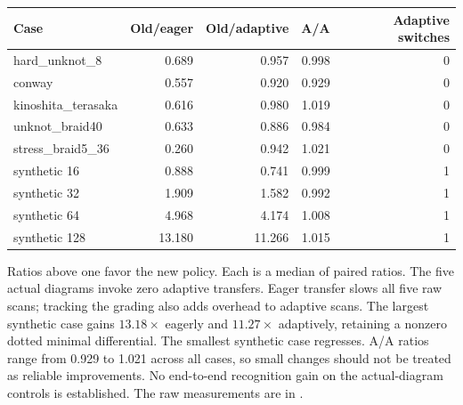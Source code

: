 \begin{center}\small
\begin{tabular}{lrrrr}
\toprule
Case & Old/eager & Old/adaptive & A/A & Adaptive switches\\
\midrule
hard\_unknot\_8 & 0.689 & 0.957 & 0.998 & 0\\
conway & 0.557 & 0.920 & 0.929 & 0\\
kinoshita\_terasaka & 0.616 & 0.980 & 1.019 & 0\\
unknot\_braid40 & 0.633 & 0.886 & 0.984 & 0\\
stress\_braid5\_36 & 0.260 & 0.942 & 1.021 & 0\\
synthetic 16 & 0.888 & 0.741 & 0.999 & 1\\
synthetic 32 & 1.909 & 1.582 & 0.992 & 1\\
synthetic 64 & 4.968 & 4.174 & 1.008 & 1\\
synthetic 128 & 13.180 & 11.266 & 1.015 & 1\\
\bottomrule
\end{tabular}
\end{center}
Ratios above one favor the new policy. Each is a median of paired ratios.
The five actual diagrams invoke zero adaptive transfers. Eager transfer slows
all five raw scans; tracking the grading also adds overhead to adaptive scans.
The largest synthetic case gains $13.18\times$ eagerly and $11.27\times$
adaptively, retaining a nonzero dotted minimal differential. The smallest
synthetic case regresses. A/A ratios range from 0.929 to 1.021 across all
cases, so small changes should not be treated as reliable improvements.
No end-to-end recognition gain on the actual-diagram controls is established.
The raw measurements are in .
